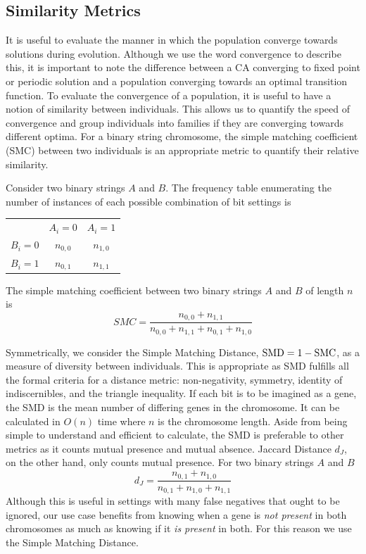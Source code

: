 \subsection{Similarity Metrics}

It is useful to evaluate the manner in which the population converge towards solutions during evolution. Although we use the word convergence to describe this, it is important to note the difference between a CA converging to fixed point or periodic solution and a population converging towards an optimal transition function. To evaluate the convergence of a population, it is useful to have a notion of similarity between individuals. This allows us to quantify the speed of convergence and group individuals into families if they are converging towards different optima. For a binary string chromosome, the simple matching coefficient (SMC) between two individuals is an appropriate metric to quantify their relative similarity. 
\begin{definition} Consider two binary strings $A$ and $B$. The frequency table enumerating the number of instances of each possible combination of bit settings is
\begin{center}
    \begin{tabular}{ c c c }
              & $A_i = 0$ & $A_i = 1$ \\ 
        $B_i = 0$ & $n_{0,0}$ & $n_{1,0}$ \\  
        $B_i = 1$ & $n_{0,1}$ & $n_{1, 1}$    
    \end{tabular}
\end{center}
The simple matching coefficient between two binary strings $A$ and $B$ of length $n$ is\\
\[
    SMC = \frac{n_{0, 0} + n_{1, 1}}{n_{0, 0} + n_{1, 1} + n_{0, 1} + n_{1, 0}}
\]
    
\end{definition}
Symmetrically, we consider the Simple Matching Distance, $\textnormal{SMD} = 1 - \textnormal{SMC}$, as a measure of diversity between individuals. This is appropriate as SMD fulfills all the formal criteria for a distance metric: non-negativity, symmetry, identity of indiscernibles, and the triangle inequality. If each bit is to be imagined as a gene, the SMD is the mean number of differing genes in the chromosome. It can be calculated in $O(n)$ time where $n$ is the chromosome length. Aside from being simple to understand and efficient to calculate, the SMD is preferable to other metrics as it counts mutual presence and mutual absence. Jaccard Distance $d_J$, on the other hand, only counts mutual presence. For two binary strings $A$ and $B$
\[
    d_J = \frac{n_{0, 1} + n_{1, 0}}{n_{0, 1} + n_{1, 0} + n_{1, 1}}
\]
Although this is useful in settings with many false negatives that ought to be ignored, our use case benefits from knowing when a gene is \textit{not present} in both chromosomes as much as knowing if it \textit{is present} in both. For this reason we use the Simple Matching Distance.

